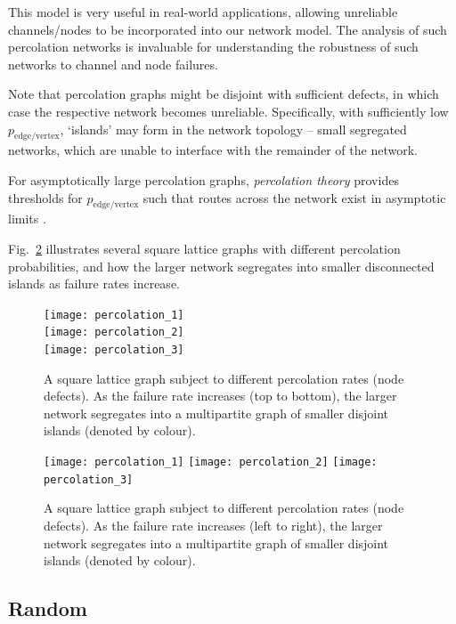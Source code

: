 This model is very useful in real-world applications, allowing unreliable channels/nodes to be incorporated into our network model. The analysis of such percolation networks is invaluable for understanding the robustness of such networks to channel and node failures.

Note that percolation graphs might be disjoint with sufficient defects, in which case the respective network becomes unreliable. Specifically, with sufficiently low $p_\mathrm{edge/vertex}$, `islands' may form in the network topology -- small segregated networks, which are unable to interface with the remainder of the network.

For asymptotically large percolation graphs, \textit{percolation theory} \cite{???} provides thresholds for $p_\mathrm{edge/vertex}$ such that routes across the network exist in asymptotic limits \cite{???}.

Fig.~\ref{fig:perc_graph} illustrates several square lattice graphs with different percolation probabilities, and how the larger network segregates into smaller disconnected islands as failure rates increase.

\pubmode
	\begin{figure}[!htbp]
	\texttt{[image: percolation\_1]}\\
	\texttt{[image: percolation\_2]}\\
	\texttt{[image: percolation\_3]}
	\captionspacefig \caption{A square lattice graph subject to different percolation rates (node defects). As the failure rate increases (top to bottom), the larger network segregates into a multipartite graph of smaller disjoint islands (denoted by colour).} \label{fig:perc_graph}
	\end{figure}
\else
	\begin{figure}[!htbp]
	\texttt{[image: percolation\_1]}
	\texttt{[image: percolation\_2]}
	\texttt{[image: percolation\_3]}
	\captionspacefig \caption{A square lattice graph subject to different percolation rates (node defects). As the failure rate increases (left to right), the larger network segregates into a multipartite graph of smaller disjoint islands (denoted by colour).} \label{fig:perc_graph}
	\end{figure}
\fi

%
%

\subsection{Random}

